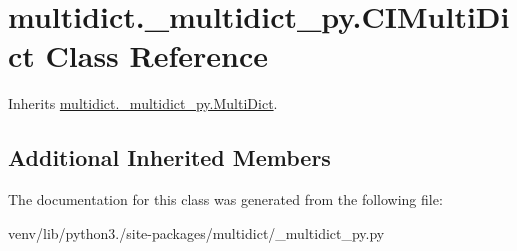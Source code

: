 \hypertarget{classmultidict_1_1__multidict__py_1_1_c_i_multi_dict}{}\section{multidict.\+\_\+multidict\+\_\+py.\+C\+I\+Multi\+Dict Class Reference}
\label{classmultidict_1_1__multidict__py_1_1_c_i_multi_dict}


Inherits \hyperlink{classmultidict_1_1__multidict__py_1_1_multi_dict}{multidict.\+\_\+multidict\+\_\+py.\+Multi\+Dict}.

\subsection*{Additional Inherited Members}


The documentation for this class was generated from the following file\+:\begin{DoxyCompactItemize}
\item 
venv/lib/python3./site-\/packages/multidict/\+\_\+multidict\+\_\+py.\+py\end{DoxyCompactItemize}
